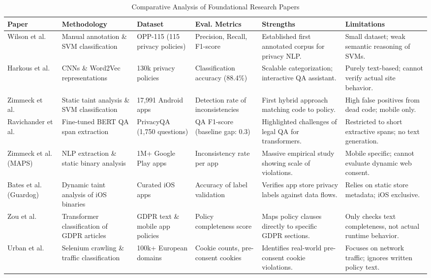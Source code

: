 \documentclass[11pt,a4paper]{article}
\begin{document}
\begin{table}[h]
\caption{Comparative Analysis of Foundational Research Papers}
\label{tab:comparison}
\centering
\begin{tabular}{p{2.3cm}p{2.3cm}p{2.2cm}p{2.3cm}p{3cm}p{3.2cm}}
\hline
\textbf{Paper} & \textbf{Methodology} & \textbf{Dataset} & \textbf{Eval. Metrics} & \textbf{Strengths} & \textbf{Limitations} \\
\hline
Wilson et al.~\cite{wilson-2016-opp115} & Manual annotation \& SVM classification & OPP-115 (115 privacy policies) & Precision, Recall, F1-score & Established first annotated corpus for privacy NLP. & Small dataset; weak semantic reasoning of SVMs. \\
\hline
Harkous et al.~\cite{harkous-2018-polisis} & CNNs \& Word2Vec representations & 130k privacy policies & Classification accuracy (88.4\%) & Scalable categorization; interactive QA assistant. & Purely text-based; cannot verify actual site behavior. \\
\hline
Zimmeck et al.~\cite{zimmeck-2017-inconsistency} & Static taint analysis \& SVM classification & 17,991 Android apps & Detection rate of inconsistencies & First hybrid approach matching code to policy. & High false positives from dead code; mobile only. \\
\hline
Ravichander et al.~\cite{ravichander-2019-privacyqa} & Fine-tuned BERT QA span extraction & PrivacyQA (1,750 questions) & QA F1-score (baseline gap: 0.3) & Highlighted challenges of legal QA for transformers. & Restricted to short extractive spans; no text generation. \\
\hline
Zimmeck et al. (MAPS)~\cite{zimmeck-2021-maps} & NLP extraction \& static binary analysis & 1M+ Google Play apps & Inconsistency rate per app & Massive empirical study showing scale of violations. & Mobile specific; cannot evaluate dynamic web consent. \\
\hline
Bates et al. (Guardog)~\cite{bates-2020-guardog} & Dynamic taint analysis of iOS binaries & Curated iOS apps & Accuracy of label validation & Verifies app store privacy labels against data flows. & Relies on static store metadata; iOS exclusive. \\
\hline
Zou et al.~\cite{zou-2023-compliance} & Transformer classification of GDPR articles & GDPR text \& mobile app policies & Policy completeness score & Maps policy clauses directly to specific GDPR sections. & Only checks text completeness, not actual runtime behavior. \\
\hline
Urban et al.~\cite{urban-2021-cookies} & Selenium crawling \& traffic classification & 100k+ European domains & Cookie counts, pre-consent cookies & Identifies real-world pre-consent cookie violations. & Focuses on network traffic; ignores written policy text. \\

\end{tabular}
\end{table}
\end{document}
